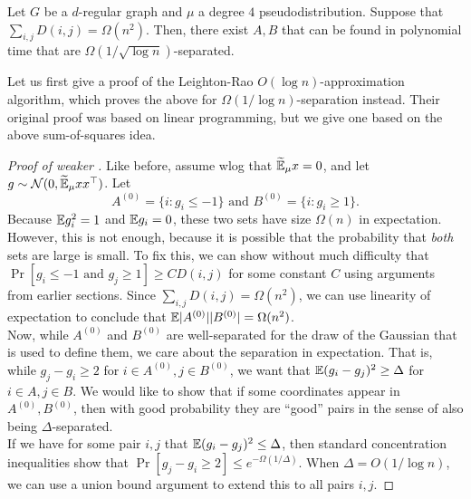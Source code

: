	\begin{ftheo}
		\label{arv-glob-struct}
		Let $G$ be a $d$-regular graph and $\mu$ a degree $4$ pseudodistribution. Suppose that $\sum_{i,j} D(i,j) = \Omega(n^2)$.
		Then, there exist $A,B$ that can be found in polynomial time that are $\Omega(1/\sqrt{\log n})$-separated.
	\end{ftheo}
	Let us first give a proof of the Leighton-Rao $O(\log n)$-approximation algorithm, which proves the above for $\Omega(1/\log n)$-separation instead. Their original proof was based on linear programming, but we give one based on the above sum-of-squares idea.
	\begin{proof}[Proof of weaker ]
		Like before, assume wlog that $\widetilde{\mathbb{E}}_\mu x = 0$, and let $g \sim \mathcal{N}(0,\widetilde{\mathbb{E}}_\mu xx^\top)$. Let
		\[ A^{(0)} = \{i : g_i \le -1\} \text{ and } B^{(0)} = \{i : g_i \ge 1\}. \]
		Because $\mathbb{E} g_i^2 = 1$ and $\mathbb{E} g_i = 0$, these two sets have size $\Omega(n)$ in expectation.\\
		However, this is not enough, because it is possible that the probability that \emph{both} sets are large is small. To fix this, we can show without much difficulty that $\Pr[g_i \le -1 \text{ and } g_j \ge 1] \ge C D(i,j)$ for some constant $C$ using arguments from earlier sections. Since $\sum_{i,j} D(i,j) = \Omega(n^2)$, we can use linearity of expectation to conclude that $\mathbb{E} |A^{(0)}||B^{(0)}| = \Omega(n^2)$.\\
		Now, while $A^{(0)}$ and $B^{(0)}$ are well-separated for the draw of the Gaussian that is used to define them, we care about the separation in expectation. That is, while $g_j - g_i \ge 2$ for $i \in A^{(0)}, j \in B^{(0)}$, we want that $\mathbb{E} (g_i - g_j)^2 \ge \Delta$ for $i \in A, j \in B$. We would like to show that if some coordinates appear in $A^{(0)},B^{(0)}$, then with good probability they are ``good'' pairs in the sense of also being $\Delta$-separated. \\
		If we have for some pair $i,j$ that $\mathbb{E} (g_i - g_j)^2 \le \Delta$, then standard concentration inequalities show that $\Pr[g_j - g_i \ge 2] \le e^{-\Omega(1/\Delta)}$. When $\Delta = O(1/\log n)$, we can use a union bound argument to extend this to all pairs $i,j$.
	\end{proof}

